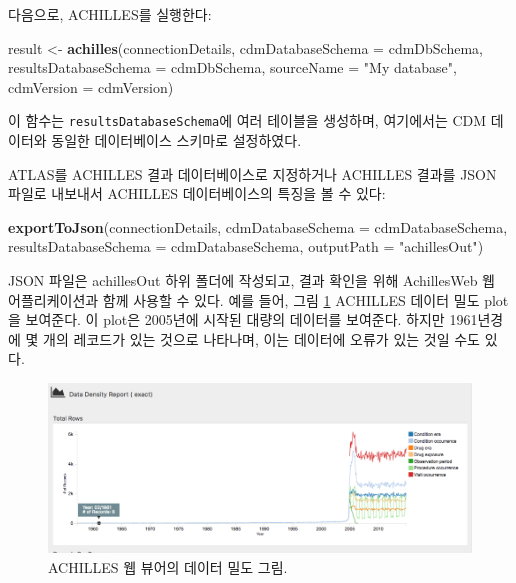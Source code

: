 \documentclass[11pt]{book}
\newenvironment{Shaded}{\begin{snugshade}}{\end{snugshade}}
\newcommand{\KeywordTok}[1]{\textcolor[rgb]{0.13,0.29,0.53}{\textbf{#1}}}
\newcommand{\DataTypeTok}[1]{\textcolor[rgb]{0.13,0.29,0.53}{#1}}
\newcommand{\StringTok}[1]{\textcolor[rgb]{0.31,0.60,0.02}{#1}}
\newcommand{\NormalTok}[1]{#1}
\theoremstyle{definition}
\theoremstyle{definition}
\theoremstyle{definition}
\theoremstyle{remark}
\begin{document}
다음으로, ACHILLES를 실행한다:

\begin{Shaded}
\begin{Highlighting}[]
\NormalTok{result <-}\StringTok{ }\KeywordTok{achilles}\NormalTok{(connectionDetails,}
                   \DataTypeTok{cdmDatabaseSchema =}\NormalTok{ cdmDbSchema,}
                   \DataTypeTok{resultsDatabaseSchema =}\NormalTok{ cdmDbSchema,}
                   \DataTypeTok{sourceName =} \StringTok{"My database"}\NormalTok{,}
                   \DataTypeTok{cdmVersion =}\NormalTok{ cdmVersion)}
\end{Highlighting}
\end{Shaded}

이 함수는 \texttt{resultsDatabaseSchema}에 여러 테이블을 생성하며,
여기에서는 CDM 데이터와 동일한 데이터베이스 스키마로 설정하였다.

ATLAS를 ACHILLES 결과 데이터베이스로 지정하거나 ACHILLES 결과를 JSON
파일로 내보내서 ACHILLES 데이터베이스의 특징을 볼 수 있다:

\begin{Shaded}
\begin{Highlighting}[]
\KeywordTok{exportToJson}\NormalTok{(connectionDetails,}
             \DataTypeTok{cdmDatabaseSchema =}\NormalTok{ cdmDatabaseSchema,}
             \DataTypeTok{resultsDatabaseSchema =}\NormalTok{ cdmDatabaseSchema,}
             \DataTypeTok{outputPath =} \StringTok{"achillesOut"}\NormalTok{)}
\end{Highlighting}
\end{Shaded}

JSON 파일은 achillesOut 하위 폴더에 작성되고, 결과 확인을 위해
AchillesWeb 웹 어플리케이션과 함께 사용할 수 있다. 예를 들어, 그림
\ref{fig:achillesDataDensity} ACHILLES 데이터 밀도 plot을 보여준다. 이
plot은 2005년에 시작된 대량의 데이터를 보여준다. 하지만 1961년경에 몇
개의 레코드가 있는 것으로 나타나며, 이는 데이터에 오류가 있는 것일 수도
있다.

\begin{figure}

{\centering \includegraphics[width=1\linewidth]{images/DataQuality/achillesDataDensity} 

}

\caption{ACHILLES 웹 뷰어의 데이터 밀도 그림.}\label{fig:achillesDataDensity}
\end{figure}
\end{document}

